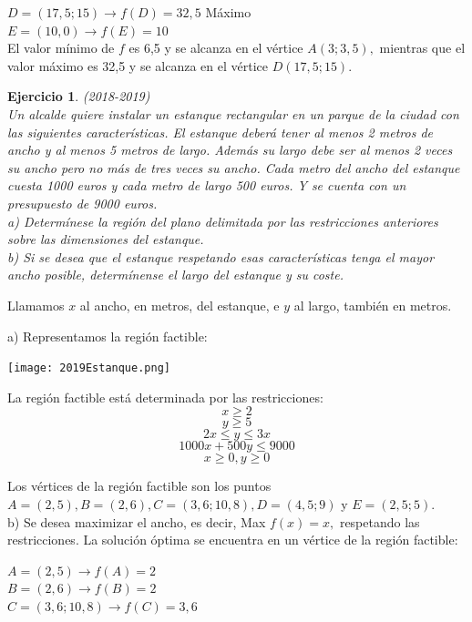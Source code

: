 \documentclass[12pt, a4paper]{amsart}
\newtheorem{ejer}{Ejercicio}
\newcommand{\s}{\color[rgb]{0,0,0.5}}
\newcommand{\n}{\color[rgb]{0,0,0}}
\begin{document}
$D=(17,5; 15) \rightarrow f(D)=32,5$ Máximo\\

$E=(10,0) \rightarrow f(E)=10$\\

El valor mínimo de $f$ es 6,5 y se alcanza en el vértice $A(3;3,5),$ mientras que el valor máximo es 32,5 y se alcanza en el vértice $D(17,5; 15).$

\n

\begin{ejer}\em (2018-2019)\\
Un alcalde quiere instalar un estanque rectangular en un parque de la ciudad con las siguientes características. El estanque deberá tener al menos 2 metros de ancho y al menos 5 metros de largo. Además su largo debe ser al menos 2 veces su ancho pero no más de tres veces su ancho. Cada metro del ancho del estanque cuesta 1000 euros y cada metro de largo 500 euros. Y se cuenta con un presupuesto de 9000 euros.\\
a) Determínese la región del plano delimitada por las restricciones anteriores sobre las dimensiones del estanque.\\
b) Si se desea que el estanque respetando esas características tenga el mayor ancho posible, determínense el largo del estanque y su coste.
\end{ejer}
\s
Llamamos $x$ al ancho, en metros, del estanque, e $y$ al largo, también en metros.

a) 
Representamos la región factible:
\begin{center}
\texttt{[image: 2019Estanque.png]}
\end{center}


La región factible está determinada por las restricciones:
\[x\geqslant 2\]
\[y\geqslant 5\]
\[2x\leqslant y \leqslant 3x\]
\[1000x+500y\leqslant 9000\]
\[x\geqslant 0, y\geqslant 0\]


Los vértices de la región factible son los puntos $A=(2,5), B=(2,6), C=(3,6; 10,8), D=(4,5; 9)$ y $E=(2,5; 5).$\\

b) Se desea maximizar el ancho, es decir, Max $f(x)=x,$ respetando las restricciones. La solución óptima se encuentra en un vértice de la región factible:

$A=(2,5) \rightarrow f(A)=2$\\

$B=(2,6) \rightarrow f(B)=2$\\

$C=(3,6; 10,8) \rightarrow f(C)=3,6$\\
\end{document}
